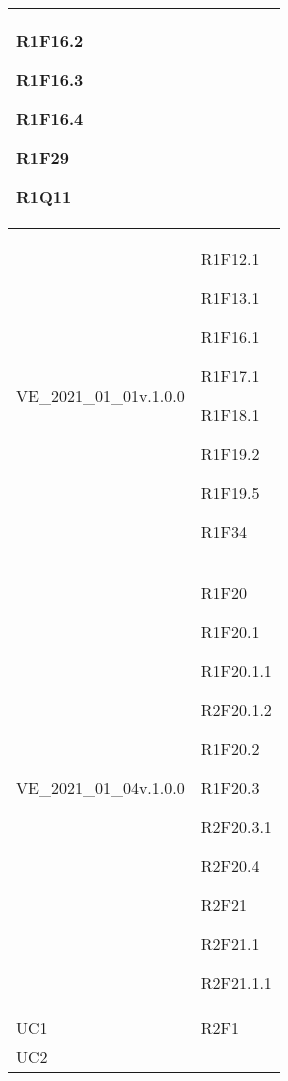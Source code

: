 \begin{center}
\begin{longtable}{|p{44mm}|p{22mm}|}
R1F16.2 \newline

R1F16.3 \newline

R1F16.4 \newline

R1F29 \newline

R1Q11 \newline
\\
\hline
VE\_2021\_01\_01v.1.0.0 &

R1F12.1 \newline

R1F13.1 \newline

R1F16.1 \newline

R1F17.1 \newline

R1F18.1 \newline

R1F19.2 \newline

R1F19.5 \newline

R1F34 \newline
\\
\hline
VE\_2021\_01\_04v.1.0.0 &

R1F20 \newline

R1F20.1 \newline

R1F20.1.1 \newline

R2F20.1.2 \newline

R1F20.2 \newline

R1F20.3 \newline

R2F20.3.1 \newline

R2F20.4 \newline

R2F21 \newline

R2F21.1 \newline

R2F21.1.1 \newline
\\
\hline
UC1 &

 R2F1 \newline
\\
\hline
UC2 &


\end{longtable}
\end{center}
